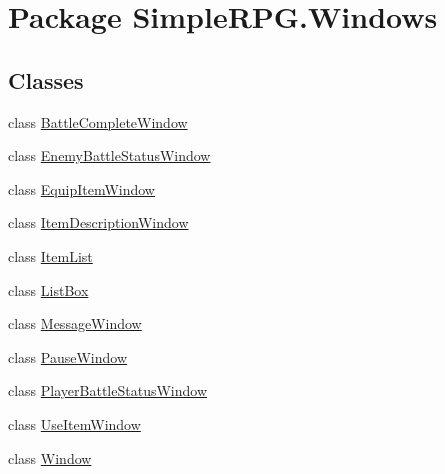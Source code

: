 \hypertarget{namespace_simple_r_p_g_1_1_windows}{\section{Package Simple\-R\-P\-G.\-Windows}
\label{namespace_simple_r_p_g_1_1_windows}
}
\subsection*{Classes}
\begin{DoxyCompactItemize}
\item 
class \hyperlink{class_simple_r_p_g_1_1_windows_1_1_battle_complete_window}{Battle\-Complete\-Window}
\item 
class \hyperlink{class_simple_r_p_g_1_1_windows_1_1_enemy_battle_status_window}{Enemy\-Battle\-Status\-Window}
\item 
class \hyperlink{class_simple_r_p_g_1_1_windows_1_1_equip_item_window}{Equip\-Item\-Window}
\item 
class \hyperlink{class_simple_r_p_g_1_1_windows_1_1_item_description_window}{Item\-Description\-Window}
\item 
class \hyperlink{class_simple_r_p_g_1_1_windows_1_1_item_list}{Item\-List}
\item 
class \hyperlink{class_simple_r_p_g_1_1_windows_1_1_list_box}{List\-Box}
\item 
class \hyperlink{class_simple_r_p_g_1_1_windows_1_1_message_window}{Message\-Window}
\item 
class \hyperlink{class_simple_r_p_g_1_1_windows_1_1_pause_window}{Pause\-Window}
\item 
class \hyperlink{class_simple_r_p_g_1_1_windows_1_1_player_battle_status_window}{Player\-Battle\-Status\-Window}
\item 
class \hyperlink{class_simple_r_p_g_1_1_windows_1_1_use_item_window}{Use\-Item\-Window}
\item 
class \hyperlink{class_simple_r_p_g_1_1_windows_1_1_window}{Window}
\end{DoxyCompactItemize}

